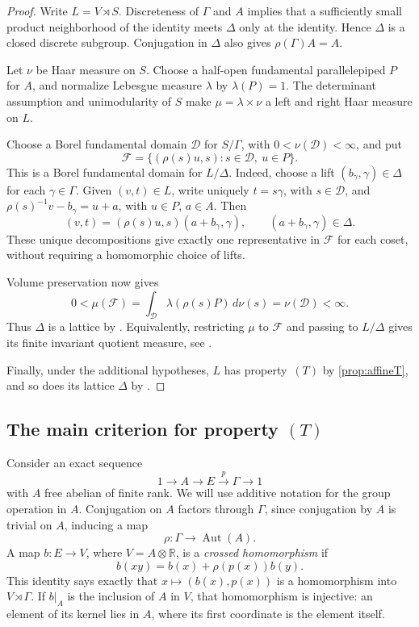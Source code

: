 \documentclass[11pt,a4paper]{article}
\theoremstyle{definition}
\newcommand{\R}{\mathbb R}
\newcommand{\rt}{(T)}
\begin{document}
\begin{proof}
Write \(L=V\rtimes S\). Discreteness of \(\Gamma\) and \(A\)
implies that a sufficiently small product neighborhood of the
identity meets \(\Delta\) only at the identity. Hence
\(\Delta\) is a closed discrete subgroup.
Conjugation in \(\Delta\) also gives \(\rho(\Gamma)A=A\).

Let \(\nu\) be Haar measure on \(S\). Choose a half-open
fundamental parallelepiped \(P\) for \(A\), and normalize
Lebesgue measure \(\lambda\) by \(\lambda(P)=1\).
The determinant assumption and unimodularity of \(S\)
make \(\mu=\lambda\times\nu\) a left and right Haar measure
on \(L\).

Choose a Borel fundamental domain \(\mathcal D\) for
\(S/\Gamma\), with \(0<\nu(\mathcal D)<\infty\), and put
\[
 \mathcal F=\{(\rho(s)u,s):s\in\mathcal D,\ u\in P\}.
\]
This is a Borel fundamental domain for \(L/\Delta\).
Indeed, choose a lift \((b_\gamma,\gamma)\in\Delta\) for
each \(\gamma\in\Gamma\). Given \((v,t)\in L\), write
uniquely \(t=s\gamma\), with \(s\in\mathcal D\), and
\(\rho(s)^{-1}v-b_\gamma=u+a\), with \(u\in P\), \(a\in A\).
Then
\[
 (v,t)=(\rho(s)u,s)(a+b_\gamma,\gamma),
 \qquad (a+b_\gamma,\gamma)\in\Delta.
\]
These unique decompositions give exactly one representative
in \(\mathcal F\) for each coset, without requiring a
homomorphic choice of lifts.

Volume preservation now gives
\[
 0<\mu(\mathcal F)
 =\int_{\mathcal D}\lambda(\rho(s)P)\,d\nu(s)
 =\nu(\mathcal D)<\infty.
\]
Thus \(\Delta\) is a lattice by
\cite[Proposition~B.2.4]{BHV}. Equivalently, restricting
\(\mu\) to \(\mathcal F\) and passing to \(L/\Delta\)
gives its finite invariant quotient measure, see
\cite[Corollary~B.1.7 and Proposition~B.2.4]{BHV}.

Finally, under the additional hypotheses, \(L\) has
property~\(\rt\) by \cref{prop:affineT}, and so does its
lattice \(\Delta\) by \cite[Theorem~1.7.1]{BHV}.
\end{proof}

\subsection{The main criterion for property \(\rt\)}

Consider an exact sequence
\begin{equation}\label{eq:extensionaction}
 1\longrightarrow A\longrightarrow E
 \xrightarrow{p}\Gamma\longrightarrow1
\end{equation}
with \(A\) free abelian of finite rank. We will use additive notation for the group operation in \(A\). 
Conjugation on \(A\)
factors through \(\Gamma\), since conjugation by \(A\)
is trivial on \(A\), inducing a map
\[ \rho: \Gamma \to \operatorname{Aut}(A). \]
A map \(b:E\to V\),
where \(V=A\otimes\R\), is a \emph{crossed homomorphism}
if
\[
 b(xy)=b(x)+\rho(p(x))b(y).
\]
This identity says exactly that
\(x\mapsto(b(x),p(x))\) is a homomorphism into
\(V\rtimes\Gamma\). If \(b|_A\) is the inclusion of
\(A\) in \(V\), that homomorphism is injective: an element
of its kernel lies in \(A\), where its first coordinate is
the element itself.
\end{document}
